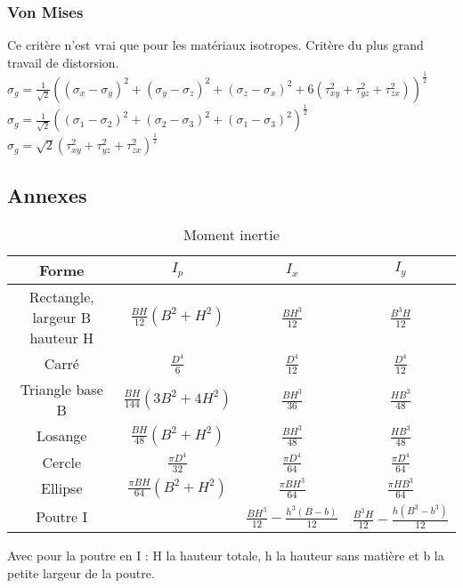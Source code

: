 \documentclass[../main.tex]{subfiles}
\begin{document}
\subsubsection{Von Mises}
Ce critère n'est vrai que pour les matériaux isotropes. Critère du plus grand travail de distorsion. \\
$\sigma_g = \frac{1}{\sqrt{2}}((\sigma_x - \sigma_y)^2 + (\sigma_y - \sigma_z)^2 + (\sigma_z - \sigma_x)^2 + 6(\tau_{xy}^2 + \tau_{yz}^2 + \tau_{zx}^2))^{\frac{1}{2}}$\\
$\sigma_g = \frac{1}{\sqrt{2}}((\sigma_1 - \sigma_2)^2 + (\sigma_2 - \sigma_3)^2 + (\sigma_1 - \sigma_3)^2)^{\frac{1}{2}} $\\
$\sigma_g = \sqrt{2} (\tau_{xy}^2 + \tau_{yz}^2 + \tau_{zx}^2)^{\frac{1}{2}}$\\

\subsection{Annexes}
\begin{table}[hbt!]
    \centering
    \begin{tabular}{||c|c|c|c|}
    \hline
    Forme & $I_p$ & $I_x$ & $I_y$\\
    \hline
       Rectangle, largeur B hauteur H  & $\frac{BH}{12}(B^2+H^2)$ & $\frac{BH^3}{12}$ & $\frac{B^3H}{12}$\\
        Carré & $\frac{D^4}{6}$ & $\frac{D^4}{12}$ & $\frac{D^4}{12}$\\
        Triangle base B & $\frac{BH}{144}(3B^2+4H^2)$ & $\frac{BH^3}{36}$ & $\frac{HB^3}{48}$\\
        Losange & $\frac{BH}{48}(B^2+H^2)$ & $\frac{BH^3}{48}$ & $\frac{HB^3}{48}$\\
        Cercle & $\frac{\pi D^4}{32}$ & $\frac{\pi D^4}{64}$ & $\frac{\pi D^4}{64}$\\
        Ellipse & $\frac{\pi BH}{64}(B^2+H^2)$ & $\frac{\pi BH^3}{64}$ & $\frac{\pi HB^3}{64}$\\
        Poutre I & & $\frac{BH^3}{12}-\frac{h^3(B-b)}{12}$ & $\frac{B^3H}{12}-\frac{h(B^3-b^3)}{12}$\\
        \hline
     \end{tabular}
    \caption{Moment inertie}
\end{table}
Avec pour la poutre en I : H la hauteur totale, h la hauteur sans matière et b la petite largeur de la poutre.\\
\end{document}
